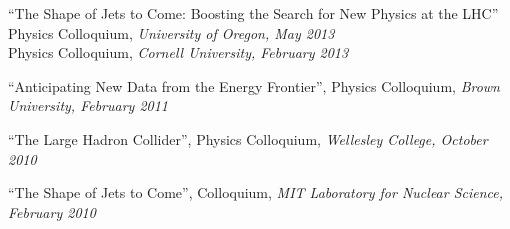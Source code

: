 \item ``The Shape of Jets to Come:  Boosting the Search for New Physics at the LHC''
\\ Physics Colloquium, \emph{University of Oregon, May 2013}
\\ Physics Colloquium, \emph{Cornell University, February 2013}

\item ``Anticipating New Data from the Energy Frontier'', Physics Colloquium, \emph{Brown University, February 2011}

\item ``The Large Hadron Collider'', Physics Colloquium, \emph{Wellesley College, October 2010}

\item ``The Shape of Jets to Come'', Colloquium, \emph{MIT Laboratory for Nuclear Science, February 2010}

\el
